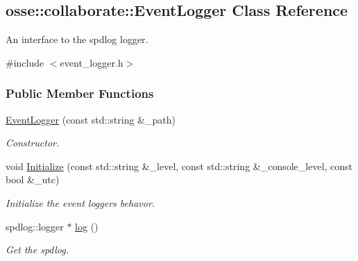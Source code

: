 \hypertarget{classosse_1_1collaborate_1_1_event_logger}{}\subsection{osse\+:\+:collaborate\+:\+:Event\+Logger Class Reference}
\label{classosse_1_1collaborate_1_1_event_logger}


An interface to the spdlog logger.  




{\ttfamily \#include $<$event\+\_\+logger.\+h$>$}

\subsubsection*{Public Member Functions}
\begin{DoxyCompactItemize}
\item 
\hyperlink{classosse_1_1collaborate_1_1_event_logger_a9c87908de9f2673fe6464b59df4082d1}{Event\+Logger} (const std\+::string \&\+\_\+path)
\begin{DoxyCompactList}\small\item\em Constructor. \end{DoxyCompactList}\item 
void \hyperlink{classosse_1_1collaborate_1_1_event_logger_ad76479bfe7482caf22f6fd9e70445640}{Initialize} (const std\+::string \&\+\_\+level, const std\+::string \&\+\_\+console\+\_\+level, const bool \&\+\_\+utc)
\begin{DoxyCompactList}\small\item\em Initialize the event logger\textquotesingle{}s behavor. \end{DoxyCompactList}\item 
spdlog\+::logger $\ast$ \hyperlink{classosse_1_1collaborate_1_1_event_logger_a76adbd3cee03eb159797eb14dd496bc6}{log} ()
\begin{DoxyCompactList}\small\item\em Get the spdlog. \end{DoxyCompactList}\end{DoxyCompactItemize}
